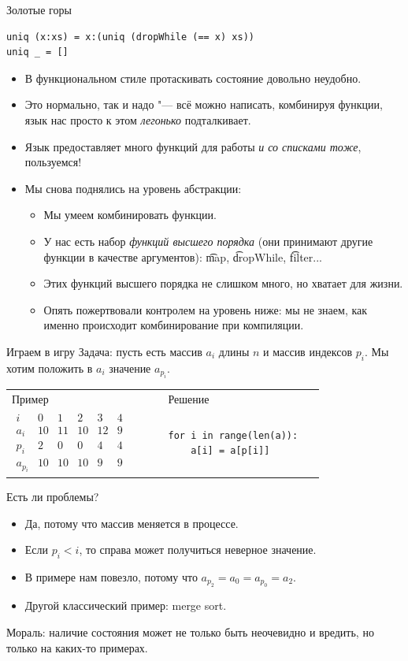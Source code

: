 \begin{frame}[fragile]{Золотые горы}
\begin{verbatim}
uniq (x:xs) = x:(uniq (dropWhile (== x) xs))
uniq _ = []
\end{verbatim}
	\begin{itemize}
		\item В функциональном стиле протаскивать состояние довольно неудобно.
		\item Это нормально, так и надо "--- всё можно написать, комбинируя функции, язык нас просто к этом \textit{легонько} подталкивает.
		\item Язык предоставляет много функций для работы \textit{и со списками тоже}, пользуемся!
		\item Мы снова поднялись на уровень абстракции:
			\begin{itemize}
				\item Мы умеем комбинировать функции.
				\item У нас есть набор \textit{функций высшего порядка} (они принимают другие функции в качестве аргументов): \t{map}, \t{dropWhile}, \t{filter}...
				\item Этих функций высшего порядка не слишком много, но хватает для жизни.
				\item Опять пожертвовали контролем на уровень ниже: мы не знаем, как именно происходит комбинирование при компиляции.
			\end{itemize}
	\end{itemize}
\end{frame}

\begin{frame}[fragile]{Играем в игру}
	Задача: пусть есть массив $a_i$ длины $n$ и массив индексов $p_i$.
	Мы хотим положить в $a_i$ значение $a_{p_i}$.
	\begin{tabular}{m{0.45\linewidth}m{0.45\linewidth}}
		\centering
		Пример & Решение \\
		\centering
		$
			\begin{array}{c|c|c|c|c|c}
				i & 0 & 1 & 2 & 3 & 4 \\\hline
				a_i & 10 & 11 & 10 & 12 & 9 \\
				p_i & 2 & 0 & 0 & 4 & 4 \\
				a_{p_i} & 10 & 10 & 10 & 9 & 9
			\end{array}
		$
		&
\begin{verbatim}
for i in range(len(a)):
    a[i] = a[p[i]]
\end{verbatim}
		\vfill
	\end{tabular}
	Есть ли проблемы?
	\pause
	\begin{itemize}
		\item Да, потому что массив меняется в процессе.
		\item Если $p_i < i$, то справа может получиться неверное значение.
		\item В примере нам повезло, потому что $a_{p_2}=a_0=a_{p_0}=a_2$.
		\item Другой классический пример: merge sort.
	\end{itemize}
	Мораль: наличие состояния может не только быть неочевидно и вредить, но только на каких-то примерах.
\end{frame}

